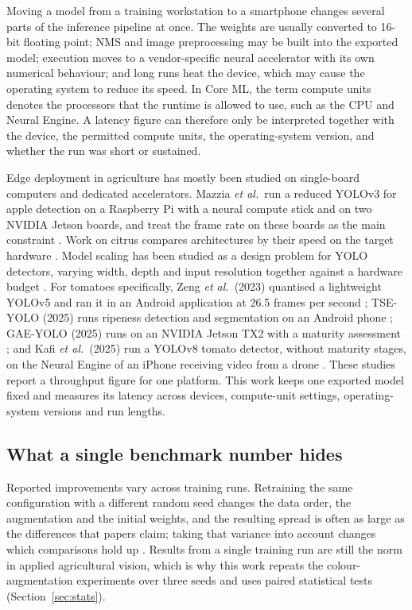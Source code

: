 Moving a model from a training workstation to a smartphone changes several
parts of the inference pipeline at once. The weights are usually converted to
16-bit floating point; NMS and image
preprocessing may be built into the exported model; execution moves to a
vendor-specific neural accelerator with its own numerical behaviour; and long
runs heat the device, which may cause the operating system to reduce its speed.
In Core ML, the term compute units denotes the processors that the
runtime is allowed to use, such as the CPU and Neural Engine. A latency figure
can therefore only be interpreted together with the device, the permitted
compute units, the operating-system version, and whether the run was short or
sustained.

Edge deployment in agriculture has mostly been studied on single-board
computers and dedicated accelerators. Mazzia \emph{et al.}\ run a reduced
YOLOv3 for apple detection on a Raspberry Pi with a neural compute stick and on
two NVIDIA Jetson boards, and treat the frame rate on these boards as the main
constraint \cite{mazzia2020edge}. Work on citrus compares architectures by
their speed on the target hardware \cite{dasilva2023citrus}. Model scaling has
been studied as a design problem for YOLO detectors, varying width, depth and
input resolution together against a hardware budget \cite{wang2021scaled}.
For tomatoes specifically, Zeng \emph{et al.}\ (2023) quantised a
lightweight YOLOv5 and ran it in an Android application at 26.5 frames per
second \cite{zeng2023mobile}; TSE-YOLO (2025) runs ripeness detection and
segmentation on an Android phone \cite{jia2025tseyolo}; GAE-YOLO (2025) runs on
an NVIDIA Jetson TX2 with a maturity assessment \cite{liu2025gaeyolo}; and Kafi
\emph{et al.}\ (2025) run a YOLOv8 tomato detector, without maturity stages, on
the Neural Engine of an iPhone receiving video from a drone
\cite{kafi2025drone}.
These studies report a throughput figure for one platform. This work keeps one
exported model fixed and measures its latency across devices, compute-unit
settings, operating-system versions and run lengths.

\subsection{What a single benchmark number hides}

Reported improvements vary across training runs. Retraining the same
configuration with a different random seed changes the data order, the
augmentation and the initial weights, and the resulting spread is often as
large as the differences that papers claim; taking that variance into account
changes which comparisons hold up \cite{bouthillier2021variance}. Results from a
single training run are still the norm in applied agricultural vision, which is
why this work repeats the colour-augmentation experiments over three seeds and
uses paired statistical tests (Section~\ref{sec:stats}).

